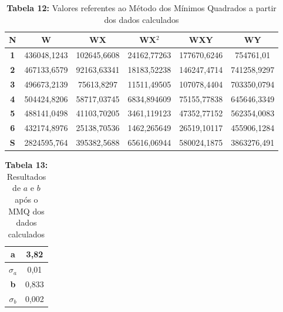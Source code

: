 \documentclass{article}
\begin{document}
\begin{table}[!ht]
	\begin{center}
		\caption*{\textbf{Tabela 12:} Valores referentes ao Método dos Mínimos Quadrados a partir dos dados calculados}
		\begin{tabular}{| c | c | c | c | c | c |}
			\hline  \multicolumn{1}{|c|}{\textbf{N}} & \multicolumn{1}{c|}{\textbf{W}} & \multicolumn{1}{c|}{\textbf{WX}} & \multicolumn{1}{c|}{\textbf{WX$^2$}} & \multicolumn{1}{c|}{WXY} & \multicolumn{1}{c|}{WY} \\  \hline
			\multicolumn{0}{|c|}{\textbf{1}} &436048,1243&102645,6608&24162,77263&177670,6246&754761,01\\ \hline
			\multicolumn{0}{|c|}{\textbf{2}} &467133,6579&92163,63341&18183,52238&146247,4714&741258,9297 \\ \hline
			\multicolumn{0}{|c|}{\textbf{3}} &496673,2139&75613,8297&11511,49505&107078,4404&703350,0794 \\ \hline
			\multicolumn{0}{|c|}{\textbf{4}} &504424,8206&58717,03745&6834,894609&75155,77838&645646,3349\\ \hline
			\multicolumn{0}{|c|}{\textbf{5}} &488141,0498&41103,70205&3461,119123&47352,77152&562354,0083 \\ \hline
			\multicolumn{0}{|c|}{\textbf{6}} &432174,8976&25138,70536&1462,265649&26519,10117&455906,1284 \\ \hline
			\multicolumn{0}{|c|}{\textbf{S}}&2824595,764&395382,5688&65616,06944&580024,1875&3863276,491\\ \hline
		\end{tabular}
	\end{center}
\end{table}

\begin{table}[!ht]
	\begin{center}
		\caption*{\textbf{Tabela 13:} Resultados de $a$ e $b$ após o MMQ dos dados calculados}
		\begin{tabular}{| c | c |}
			\hline 
			\multicolumn{0}{|c|}{\textbf{a}} & 3,82 \\ \hline
			\multicolumn{0}{|c|}{\textbf{$\sigma_a$}} & 0,01 \\ \hline
			\multicolumn{0}{|c|}{\textbf{b}} & 0,833\\ \hline
			\multicolumn{0}{|c|}{\textbf{$\sigma_b$}} & 0,002 \\ \hline
		\end{tabular}
	\end{center}
\end{table}
\end{document}
